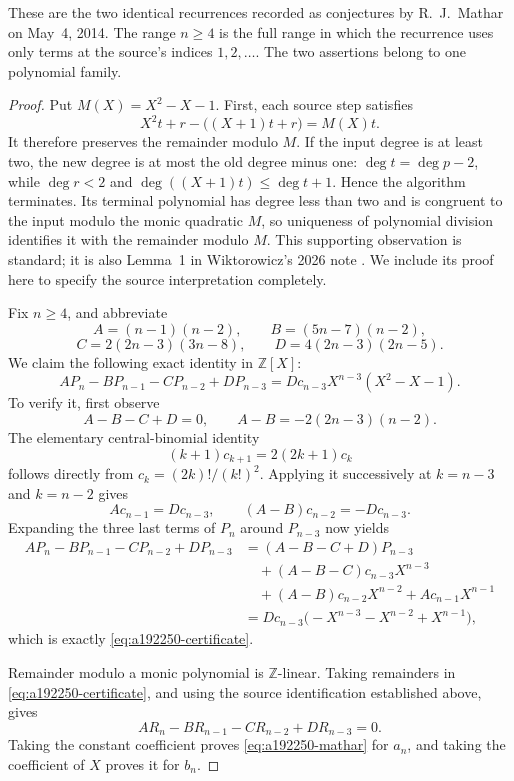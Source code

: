 \documentclass[11pt]{article}
\begin{document}
These are the two identical recurrences recorded as conjectures by
R.~J.~Mathar on May~4, 2014. The range $n\geq4$ is the full range in
which the recurrence uses only terms at the source's indices $1,2,\ldots$.
The two assertions belong to one polynomial family.

\begin{proof}
Put $M(X)=X^2-X-1$. First, each source step satisfies
\[
 X^2t+r-\bigl((X+1)t+r\bigr)=M(X)t.
\]
It therefore preserves the remainder modulo $M$. If the input degree is
at least two, the new degree is at most the old degree minus one:
$\deg t=\deg p-2$, while $\deg r<2$ and
$\deg((X+1)t)\leq\deg t+1$. Hence the algorithm terminates.
Its terminal polynomial has degree less than two and is congruent to
the input modulo the monic quadratic $M$, so uniqueness of polynomial
division identifies it with the remainder modulo $M$. This supporting
observation is standard; it is also Lemma~1 in Wiktorowicz's 2026 note
\cite{Wiktorowicz2026Reduction}. We include its proof here to specify the
source interpretation completely.

Fix $n\geq4$, and abbreviate
\[
 A=(n-1)(n-2),\qquad B=(5n-7)(n-2),
\]
\[
 C=2(2n-3)(3n-8),\qquad D=4(2n-3)(2n-5).
\]
We claim the following exact identity in $\mathbb Z[X]$:
\begin{equation}
\label{eq:a192250-certificate}
 A P_n-B P_{n-1}-C P_{n-2}+D P_{n-3}
   =D c_{n-3}X^{n-3}(X^2-X-1).
\end{equation}
To verify it, first observe
\[
 A-B-C+D=0,\qquad A-B=-2(2n-3)(n-2).
\]
The elementary central-binomial identity
\[
 (k+1)c_{k+1}=2(2k+1)c_k
\]
follows directly from $c_k=(2k)!/(k!)^2$. Applying it successively at
$k=n-3$ and $k=n-2$ gives
\[
 A c_{n-1}=D c_{n-3},\qquad
 (A-B)c_{n-2}=-D c_{n-3}.
\]
Expanding the three last terms of $P_n$ around $P_{n-3}$ now yields
\begin{align*}
 A P_n-B P_{n-1}-C P_{n-2}+D P_{n-3}
 &= (A-B-C+D)P_{n-3}\\
 &\quad +(A-B-C)c_{n-3}X^{n-3}\\
 &\quad +(A-B)c_{n-2}X^{n-2}
       +A c_{n-1}X^{n-1}\\
 &=D c_{n-3}\bigl(-X^{n-3}-X^{n-2}+X^{n-1}\bigr),
\end{align*}
which is exactly \eqref{eq:a192250-certificate}.

Remainder modulo a monic polynomial is $\mathbb Z$-linear.
Taking remainders in \eqref{eq:a192250-certificate}, and using the source
identification established above, gives
\[
 A R_n-B R_{n-1}-C R_{n-2}+D R_{n-3}=0.
\]
Taking the constant coefficient proves \eqref{eq:a192250-mathar} for
$a_n$, and taking the coefficient of $X$ proves it for $b_n$.
\end{proof}
\end{document}
